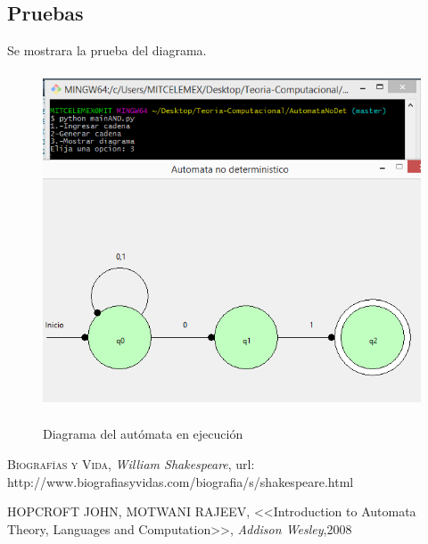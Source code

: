 \documentclass[12pt,letterpaper]{article}
\begin{document}
\subsection{Pruebas}
Se mostrara la prueba del diagrama.\\
\begin{figure}[H]
\includegraphics[width=\textwidth, height=10cm]{diagAND.png}
\label{fig:diagAND}
\caption{Diagrama del aut\'omata en ejecuci\'on}
\end{figure}
\newpage

\begin{thebibliography}{X}
 \textsc{Biograf\'ias y Vida},
\textit{William Shakespeare}, url: http://www.biografiasyvidas.com/biografia/s/shakespeare.html

 \textsc{	HOPCROFT JOHN, MOTWANI RAJEEV},
<<Introduction to Automata Theory,
Languages and Computation>>,
\textit{Addison Wesley},2008
\end{thebibliography}
\end{document}
